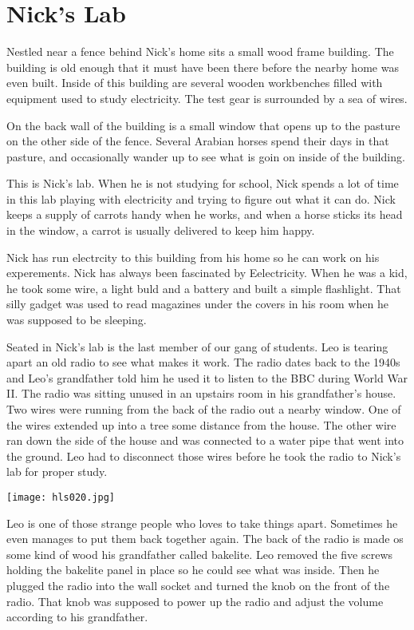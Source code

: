 \chapter{Nick's Lab}

Nestled near a fence behind Nick's home sits a small wood frame building. The
building is old enough that it must have been there before the nearby home was even 
built.  Inside of this building are several wooden workbenches filled with equipment
used to study electricity. The test gear is surrounded by a sea of wires. 

On the back wall of the building is a small window that opens up to the pasture
on the other side of the fence. Several Arabian horses spend their days in that
pasture, and occasionally wander up to see what is goin on inside of the
building. 

This is Nick's lab. When he is not studying for school, Nick spends a lot of
time in this lab playing with electricity and trying to figure out what it can do.
Nick keeps a supply of carrots handy when he works, and when a horse sticks its
head in the window, a carrot is usually delivered to keep him happy.

Nick has run electrcity to this building from his home so he can work on his experements.
Nick has always been fascinated by Eelectricity. When he was a kid, he took some wire, a
light buld and a battery and built a simple flashlight. That silly gadget was
used to read magazines under the covers in his room when he was supposed to be
sleeping.

Seated in Nick's lab is the last member of our gang of students. Leo is tearing
apart an old radio to see what makes it work. The radio dates back to the 1940s
and Leo's grandfather told him he used it to listen to the BBC during World War
II. The radio was sitting unused in an upstairs room in his grandfather's
house. Two wires were running from the back of the radio out a nearby window.
One of the wires extended up into a tree some distance from the house. The
other wire ran down the side of the house and was connected to a water pipe
that went into the ground. Leo had to disconnect those wires before he took the
radio to Nick's lab for proper study.

\texttt{[image: hls020.jpg]}

Leo is one of those strange people who loves to take things apart. Sometimes he
even manages to put them back together again. The back of the radio is made os
some kind of wood his grandfather called bakelite. Leo removed the five screws
holding the bakelite panel in place so he could see what was inside. Then he
plugged the radio into the wall socket and turned the knob on the front of the
radio. That knob was supposed to power up the radio and adjust the volume
according to his grandfather.

